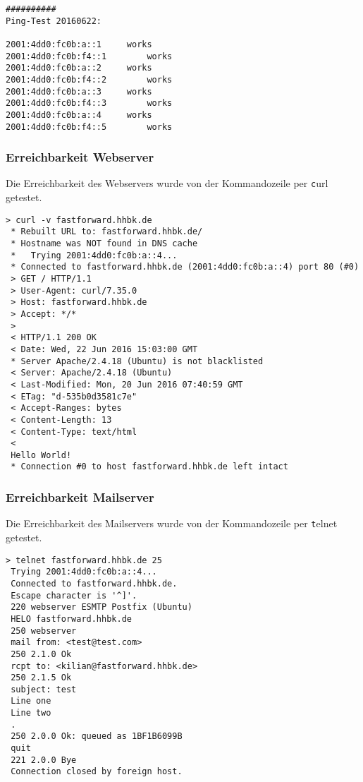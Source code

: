 \begin{lstlisting}
##########
Ping-Test 20160622:

2001:4dd0:fc0b:a::1		works
2001:4dd0:fc0b:f4::1		works
2001:4dd0:fc0b:a::2		works
2001:4dd0:fc0b:f4::2		works
2001:4dd0:fc0b:a::3		works
2001:4dd0:fc0b:f4::3		works
2001:4dd0:fc0b:a::4		works
2001:4dd0:fc0b:f4::5		works
\end{lstlisting}

\subsubsection{Erreichbarkeit Webserver}

Die Erreichbarkeit des Webservers wurde von der Kommandozeile per {\texttt curl} getestet.

\begin{lstlisting}[numbers=none]
> curl -v fastforward.hhbk.de
 * Rebuilt URL to: fastforward.hhbk.de/
 * Hostname was NOT found in DNS cache
 *   Trying 2001:4dd0:fc0b:a::4...
 * Connected to fastforward.hhbk.de (2001:4dd0:fc0b:a::4) port 80 (#0)
 > GET / HTTP/1.1
 > User-Agent: curl/7.35.0
 > Host: fastforward.hhbk.de
 > Accept: */*
 > 
 < HTTP/1.1 200 OK
 < Date: Wed, 22 Jun 2016 15:03:00 GMT
 * Server Apache/2.4.18 (Ubuntu) is not blacklisted
 < Server: Apache/2.4.18 (Ubuntu)
 < Last-Modified: Mon, 20 Jun 2016 07:40:59 GMT
 < ETag: "d-535b0d3581c7e"
 < Accept-Ranges: bytes
 < Content-Length: 13
 < Content-Type: text/html
 < 
 Hello World!
 * Connection #0 to host fastforward.hhbk.de left intact
\end{lstlisting}

\subsubsection{Erreichbarkeit Mailserver}

Die Erreichbarkeit des Mailservers wurde von der Kommandozeile per {\texttt telnet} getestet.

\begin{lstlisting}[numbers=none]
> telnet fastforward.hhbk.de 25
 Trying 2001:4dd0:fc0b:a::4...
 Connected to fastforward.hhbk.de.
 Escape character is '^]'.
 220 webserver ESMTP Postfix (Ubuntu)
 HELO fastforward.hhbk.de
 250 webserver
 mail from: <test@test.com>
 250 2.1.0 Ok
 rcpt to: <kilian@fastforward.hhbk.de>
 250 2.1.5 Ok
 subject: test
 Line one
 Line two
 .
 250 2.0.0 Ok: queued as 1BF1B6099B
 quit
 221 2.0.0 Bye
 Connection closed by foreign host.
\end{lstlisting}

